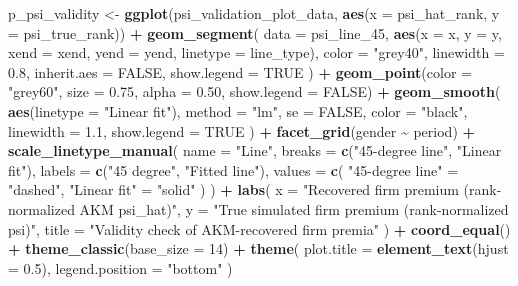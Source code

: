 \documentclass[
]{article}
\newenvironment{Shaded}{\begin{snugshade}}{\end{snugshade}}
\newcommand{\AttributeTok}[1]{\textcolor[rgb]{0.13,0.29,0.53}{#1}}
\newcommand{\ConstantTok}[1]{\textcolor[rgb]{0.56,0.35,0.01}{#1}}
\newcommand{\DecValTok}[1]{\textcolor[rgb]{0.00,0.00,0.81}{#1}}
\newcommand{\FloatTok}[1]{\textcolor[rgb]{0.00,0.00,0.81}{#1}}
\newcommand{\FunctionTok}[1]{\textcolor[rgb]{0.13,0.29,0.53}{\textbf{#1}}}
\newcommand{\NormalTok}[1]{#1}
\newcommand{\OtherTok}[1]{\textcolor[rgb]{0.56,0.35,0.01}{#1}}
\newcommand{\SpecialCharTok}[1]{\textcolor[rgb]{0.81,0.36,0.00}{\textbf{#1}}}
\newcommand{\StringTok}[1]{\textcolor[rgb]{0.31,0.60,0.02}{#1}}
\begin{document}
\begin{Shaded}
\begin{Highlighting}[]
\NormalTok{p\_psi\_validity }\OtherTok{\textless{}{-}} \FunctionTok{ggplot}\NormalTok{(psi\_validation\_plot\_data, }\FunctionTok{aes}\NormalTok{(}\AttributeTok{x =}\NormalTok{ psi\_hat\_rank, }\AttributeTok{y =}\NormalTok{ psi\_true\_rank)) }\SpecialCharTok{+}
    \FunctionTok{geom\_segment}\NormalTok{(}
        \AttributeTok{data =}\NormalTok{ psi\_line\_45,}
        \FunctionTok{aes}\NormalTok{(}\AttributeTok{x =}\NormalTok{ x, }\AttributeTok{y =}\NormalTok{ y, }\AttributeTok{xend =}\NormalTok{ xend, }\AttributeTok{yend =}\NormalTok{ yend, }\AttributeTok{linetype =}\NormalTok{ line\_type),}
        \AttributeTok{color =} \StringTok{"grey40"}\NormalTok{,}
        \AttributeTok{linewidth =} \FloatTok{0.8}\NormalTok{,}
        \AttributeTok{inherit.aes =} \ConstantTok{FALSE}\NormalTok{,}
        \AttributeTok{show.legend =} \ConstantTok{TRUE}
\NormalTok{    ) }\SpecialCharTok{+}
    \FunctionTok{geom\_point}\NormalTok{(}\AttributeTok{color =} \StringTok{"grey60"}\NormalTok{, }\AttributeTok{size =} \FloatTok{0.75}\NormalTok{, }\AttributeTok{alpha =} \FloatTok{0.50}\NormalTok{, }\AttributeTok{show.legend =} \ConstantTok{FALSE}\NormalTok{) }\SpecialCharTok{+}
    \FunctionTok{geom\_smooth}\NormalTok{(}
        \FunctionTok{aes}\NormalTok{(}\AttributeTok{linetype =} \StringTok{"Linear fit"}\NormalTok{),}
        \AttributeTok{method =} \StringTok{"lm"}\NormalTok{,}
        \AttributeTok{se =} \ConstantTok{FALSE}\NormalTok{,}
        \AttributeTok{color =} \StringTok{"black"}\NormalTok{,}
        \AttributeTok{linewidth =} \FloatTok{1.1}\NormalTok{,}
        \AttributeTok{show.legend =} \ConstantTok{TRUE}
\NormalTok{    ) }\SpecialCharTok{+}
    \FunctionTok{facet\_grid}\NormalTok{(gender }\SpecialCharTok{\textasciitilde{}}\NormalTok{ period) }\SpecialCharTok{+}
    \FunctionTok{scale\_linetype\_manual}\NormalTok{(}
        \AttributeTok{name =} \StringTok{"Line"}\NormalTok{,}
        \AttributeTok{breaks =} \FunctionTok{c}\NormalTok{(}\StringTok{"45{-}degree line"}\NormalTok{, }\StringTok{"Linear fit"}\NormalTok{),}
        \AttributeTok{labels =} \FunctionTok{c}\NormalTok{(}\StringTok{"45 degree"}\NormalTok{, }\StringTok{"Fitted line"}\NormalTok{),}
        \AttributeTok{values =} \FunctionTok{c}\NormalTok{(}
            \StringTok{"45{-}degree line"} \OtherTok{=} \StringTok{"dashed"}\NormalTok{,}
            \StringTok{"Linear fit"} \OtherTok{=} \StringTok{"solid"}
\NormalTok{        )}
\NormalTok{    ) }\SpecialCharTok{+}
    \FunctionTok{labs}\NormalTok{(}
        \AttributeTok{x =} \StringTok{"Recovered firm premium (rank{-}normalized AKM psi\_hat)"}\NormalTok{,}
        \AttributeTok{y =} \StringTok{"True simulated firm premium (rank{-}normalized psi)"}\NormalTok{,}
        \AttributeTok{title =} \StringTok{"Validity check of AKM{-}recovered firm premia"}
\NormalTok{    ) }\SpecialCharTok{+}
    \FunctionTok{coord\_equal}\NormalTok{() }\SpecialCharTok{+}
    \FunctionTok{theme\_classic}\NormalTok{(}\AttributeTok{base\_size =} \DecValTok{14}\NormalTok{) }\SpecialCharTok{+}
    \FunctionTok{theme}\NormalTok{(}
        \AttributeTok{plot.title =} \FunctionTok{element\_text}\NormalTok{(}\AttributeTok{hjust =} \FloatTok{0.5}\NormalTok{),}
        \AttributeTok{legend.position =} \StringTok{"bottom"}
\NormalTok{    )}


\end{Highlighting}
\end{Shaded}
\end{document}
